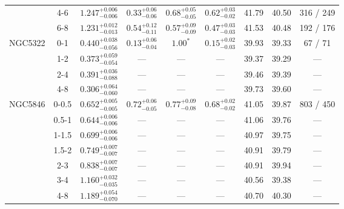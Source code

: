 \documentclass[structabstract]{aa}
\begin{document}
{{\begin{longtable}{lcccccccc}
 & 4-6 & $ 1.247 _{- 0.006 }^{+ 0.006 } $ & $  0.33 _{-  0.06 }^{+  0.06 } $ & $  0.68 _{-  0.05 }^{+  0.05 } $ & $  0.62 _{-  0.02 }^{+  0.03 } $ &  41.79 & 40.50  &   316 /   249 \\
 & 6-8 & $ 1.231 _{- 0.013 }^{+ 0.012 } $ & $  0.54 _{-  0.11 }^{+  0.12 } $ & $  0.57 _{-  0.09 }^{+  0.09 } $ & $  0.47 _{-  0.03 }^{+  0.03 } $ &  41.53 & 40.48  &   192 /   176 \\
\hline
NGC5322 & 0-1 & $ 0.440 _{- 0.056 }^{+ 0.038 } $ & $  0.13 _{-  0.04 }^{+  0.06 } $ & $ 1.00^{\ast} $ & $  0.15 _{-  0.03 }^{+  0.02 } $ &  39.93 & 39.33 &    67 /    71 \\
 & 1-2 & $ 0.373 _{- 0.054 }^{+ 0.059 } $ & --- & --- & --- &  39.37 & 39.29 & --- \\
 & 2-4 & $ 0.391 _{- 0.088 }^{+ 0.036 } $ & --- & --- & --- &  39.46 & 39.39 & --- \\
 & 4-8 & $ 0.306 _{- 0.060 }^{+ 0.064 } $ & --- & --- & --- &  39.73 & 39.60 & --- \\
\hline
NGC5846 & 0-0.5 & $ 0.652 _{- 0.005 }^{+ 0.005 } $ & $  0.72 _{-  0.05 }^{+  0.06 } $ & $  0.77 _{-  0.08 }^{+  0.09 } $ & $  0.68 _{-  0.02 }^{+  0.02 } $ &  41.05 & 39.87 &   803 /   450 \\
 & 0.5-1 & $ 0.644 _{- 0.006 }^{+ 0.006 } $ & --- & --- & --- &  41.06 & 39.76 & --- \\
 & 1-1.5 & $ 0.699 _{- 0.006 }^{+ 0.006 } $ & --- & --- & --- &  40.97 & 39.75 & --- \\
 & 1.5-2 & $ 0.749 _{- 0.007 }^{+ 0.007 } $ & --- & --- & --- &  40.91 & 39.79 & --- \\
 & 2-3 & $ 0.838 _{- 0.007 }^{+ 0.007 } $ & --- & --- & --- &  40.91 & 39.94 & --- \\
 & 3-4 & $ 1.160 _{- 0.035 }^{+ 0.032 } $ & --- & --- & --- &  40.56 & 39.38 & --- \\
 & 4-8 & $ 1.189 _{- 0.070 }^{+ 0.054 } $ & --- & --- & --- &  40.70 & 40.30 & --- \\
\hline
\end{longtable}
}

}
\end{document}
